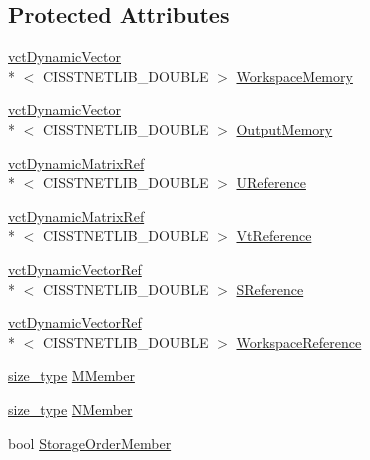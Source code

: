 \subsection*{Protected Attributes}
\begin{DoxyCompactItemize}
\item 
\hyperlink{classvct_dynamic_vector}{vct\-Dynamic\-Vector}\\*
$<$ C\-I\-S\-S\-T\-N\-E\-T\-L\-I\-B\-\_\-\-D\-O\-U\-B\-L\-E $>$ \hyperlink{classnmr_s_v_d_economy_dynamic_data_a7e195abf076d992a6c1d4a29ec76be91}{Workspace\-Memory}
\item 
\hyperlink{classvct_dynamic_vector}{vct\-Dynamic\-Vector}\\*
$<$ C\-I\-S\-S\-T\-N\-E\-T\-L\-I\-B\-\_\-\-D\-O\-U\-B\-L\-E $>$ \hyperlink{classnmr_s_v_d_economy_dynamic_data_ad990316888e2acec08d79e59a4284fa4}{Output\-Memory}
\end{DoxyCompactItemize}
{\bf }\par
\begin{DoxyCompactItemize}
\item 
\hyperlink{classvct_dynamic_matrix_ref}{vct\-Dynamic\-Matrix\-Ref}\\*
$<$ C\-I\-S\-S\-T\-N\-E\-T\-L\-I\-B\-\_\-\-D\-O\-U\-B\-L\-E $>$ \hyperlink{classnmr_s_v_d_economy_dynamic_data_ab6a5af5bd7884ddd590aef7ad83d1194}{U\-Reference}
\item 
\hyperlink{classvct_dynamic_matrix_ref}{vct\-Dynamic\-Matrix\-Ref}\\*
$<$ C\-I\-S\-S\-T\-N\-E\-T\-L\-I\-B\-\_\-\-D\-O\-U\-B\-L\-E $>$ \hyperlink{classnmr_s_v_d_economy_dynamic_data_adf2c8ef077330ba421fccf814cfffc58}{Vt\-Reference}
\item 
\hyperlink{classvct_dynamic_vector_ref}{vct\-Dynamic\-Vector\-Ref}\\*
$<$ C\-I\-S\-S\-T\-N\-E\-T\-L\-I\-B\-\_\-\-D\-O\-U\-B\-L\-E $>$ \hyperlink{classnmr_s_v_d_economy_dynamic_data_a5f21313bc7280084d7855b4a772960d7}{S\-Reference}
\item 
\hyperlink{classvct_dynamic_vector_ref}{vct\-Dynamic\-Vector\-Ref}\\*
$<$ C\-I\-S\-S\-T\-N\-E\-T\-L\-I\-B\-\_\-\-D\-O\-U\-B\-L\-E $>$ \hyperlink{classnmr_s_v_d_economy_dynamic_data_a0f1d57b8c7b8756b73ae5c72e3b2037a}{Workspace\-Reference}
\end{DoxyCompactItemize}

{\bf }\par
\begin{DoxyCompactItemize}
\item 
\hyperlink{classnmr_s_v_d_economy_dynamic_data_aee8ff15f2e92af24fdc3c7f5908770f3}{size\-\_\-type} \hyperlink{classnmr_s_v_d_economy_dynamic_data_a850f29c6d2376c0f87b56b66c0fccfa5}{M\-Member}
\item 
\hyperlink{classnmr_s_v_d_economy_dynamic_data_aee8ff15f2e92af24fdc3c7f5908770f3}{size\-\_\-type} \hyperlink{classnmr_s_v_d_economy_dynamic_data_ae4ce223f5b2cd6171d09810aa08a7a8b}{N\-Member}
\item 
bool \hyperlink{classnmr_s_v_d_economy_dynamic_data_afd61787cd2b1d49a68fe80d55c912f7a}{Storage\-Order\-Member}
\end{DoxyCompactItemize}

